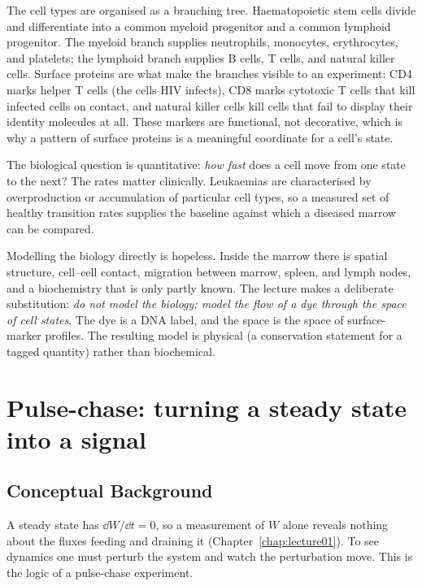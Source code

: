 The cell types are organised as a branching tree. Haematopoietic stem cells divide and differentiate into a common myeloid progenitor and a common lymphoid progenitor. The myeloid branch supplies neutrophils, monocytes, erythrocytes, and platelets; the lymphoid branch supplies B cells, T cells, and natural killer cells. Surface proteins are what make the branches visible to an experiment: CD4 marks helper T cells (the cells HIV infects), CD8 marks cytotoxic T cells that kill infected cells on contact, and natural killer cells kill cells that fail to display their identity molecules at all. These markers are functional, not decorative, which is why a pattern of surface proteins is a meaningful coordinate for a cell's state.

The biological question is quantitative: \emph{how fast} does a cell move from one state to the next? The rates matter clinically. Leukaemias are characterised by overproduction or accumulation of particular cell types, so a measured set of healthy transition rates supplies the baseline against which a diseased marrow can be compared.

Modelling the biology directly is hopeless. Inside the marrow there is spatial structure, cell--cell contact, migration between marrow, spleen, and lymph nodes, and a biochemistry that is only partly known. The lecture makes a deliberate substitution: \emph{do not model the biology; model the flow of a dye through the space of cell states}. The dye is a DNA label, and the space is the space of surface-marker profiles. The resulting model is physical (a conservation statement for a tagged quantity) rather than biochemical.

\section{Pulse-chase: turning a steady state into a signal}\label{sec:lec02:pulse-chase}

\subsection*{Conceptual Background}
A steady state has $\dd W/\dd t=0$, so a measurement of $W$ alone reveals nothing about the fluxes feeding and draining it (Chapter~\ref{chap:lecture01}). To see dynamics one must perturb the system and watch the perturbation move. This is the logic of a pulse-chase experiment.


